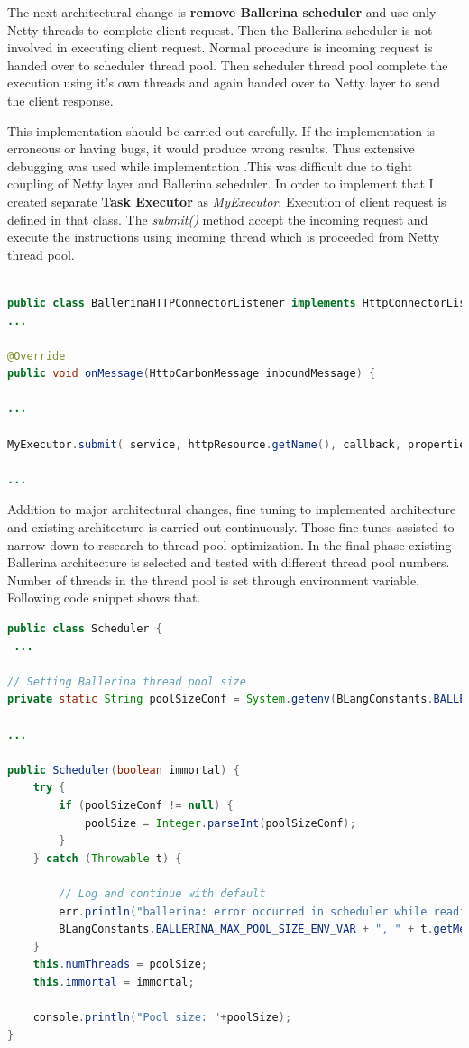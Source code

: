 The next architectural change is \textbf{remove Ballerina scheduler} and use only Netty threads to complete client request. Then the Ballerina scheduler is not involved in executing client request. Normal procedure is incoming request is handed over to scheduler thread pool. Then scheduler thread pool complete the execution using it's own threads and again handed over to Netty layer to send the client response. 

This implementation should be carried out carefully. If the implementation is erroneous or having bugs, it would produce wrong results. Thus extensive debugging was used while implementation .This was difficult due to tight coupling of Netty layer and Ballerina scheduler. In order to implement that I created separate \textbf{Task Executor} as \textit{MyExecutor}. Execution of client request is defined in that class. The \textit{submit()} method accept the incoming request and execute the instructions using incoming thread which is proceeded from Netty thread pool.


\begin{lstlisting}[language=Java]

public class BallerinaHTTPConnectorListener implements HttpConnectorListener {
...

@Override
public void onMessage(HttpCarbonMessage inboundMessage) {

...

MyExecutor.submit( service, httpResource.getName(), callback, properties, signatureParams);

...

\end{lstlisting}


Addition to major architectural changes, fine tuning to implemented architecture and existing architecture is carried out continuously. Those fine tunes assisted to narrow down to research to thread pool optimization. In the final phase existing Ballerina architecture is selected and tested with different thread pool numbers. Number of threads in the thread pool is set through environment variable. Following code snippet shows that.


\begin{lstlisting}[language=Java]
public class Scheduler {
 ...

// Setting Ballerina thread pool size 
private static String poolSizeConf = System.getenv(BLangConstants.BALLERINA_MAX_POOL_SIZE_ENV_VAR);

...

public Scheduler(boolean immortal) {
	try {
 		if (poolSizeConf != null) {
  			poolSize = Integer.parseInt(poolSizeConf);
 		}
	} catch (Throwable t) {
	
		// Log and continue with default
		err.println("ballerina: error occurred in scheduler while reading system variable:" +
		BLangConstants.BALLERINA_MAX_POOL_SIZE_ENV_VAR + ", " + t.getMessage());
	}
	this.numThreads = poolSize;
	this.immortal = immortal;

	console.println("Pool size: "+poolSize);
}

\end{lstlisting}



